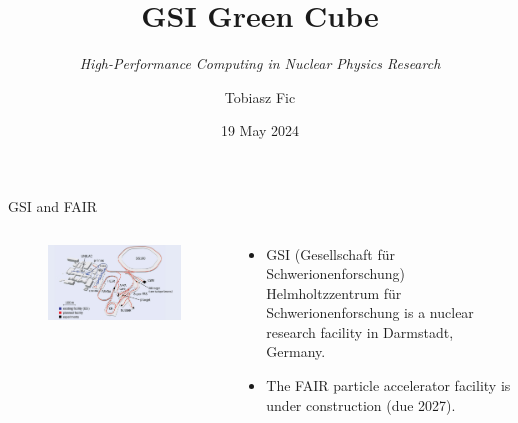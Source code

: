 


\title{GSI Green Cube}
    \subtitle{\textit{High-Performance Computing in Nuclear Physics Research}}
\author{Tobiasz Fic}
\date{19 May 2024}



\begin{frame}
    \maketitle
\end{frame}

\begin{frame}{GSI and FAIR}
    \begin{columns}
        \begin{column}{0.5\textwidth}
            \begin{figure}
                \centering
                \includegraphics[width=\textwidth]{images/fair_sis100_diagram.jpg}
            \end{figure}
        \end{column}
        \begin{column}{0.5\textwidth}
            \begin{itemize}
                \item GSI (Gesellschaft für Schwerionenforschung) Helmholtzzentrum für Schwerionenforschung is a nuclear research facility in Darmstadt, Germany.
                \item The FAIR particle accelerator  facility is under construction (due 2027).
            \end{itemize}
        \end{column}
    \end{columns}
\end{frame}


